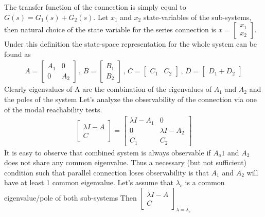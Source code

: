 \documentclass[twoside]{article}
\begin{document}
The transfer function of the connection is simply equal to $G(s) = G_1(s) + G_2(s)$. Let $x_1$ and $x_2$
state-variables of the sub-systems, then natural choice of the state variable for the series connection is 
$x = \begin{bmatrix} x_1 \\ x_2 \end{bmatrix}$. Under this definition the state-space representation for the whole system 
can be found as
%
\begin{align*}
A = \left[ \begin{array}{c|c} A_1 & 0 \\ \hline 0  & A_2 \end{array} \right]
\, , \, B = \left[ \begin{array}{c} B_1 \\ \hline B_2   \end{array} \right]
\, , \, C = \left[ \begin{array}{c|c} C_1 & C_2  \end{array} \right]
\, , \, D = \left[ \begin{array}{c} D_1 +  D_2  \end{array} \right]
\end{align*}
%
Clearly eigenvalues of A are the combination of the eigenvalues of $A_1$ and $A_2$ and the poles of the system 
Let's analyze the observability of the connection via one of the modal reachability tests. 
%
\begin{align*}
	\left[ \begin{array}{c} \lambda I - A \\ \hline C \end{array} \right]
	= 
	\left[ \begin{array}{c|c} \lambda I - A_1 & 0 \\ \hline 0 &  \lambda I - A_2 \\ \hline 
	 C_1 & C_2
	\end{array} \right]
\end{align*}
%
It is easy to observe that combined system is always observable if $A_o1$ 
and $A_2$ does not share any common eigenvalue. Thus a necessary (but not sufficient) condition 
such that parallel connection loses observability is that $A_1$ and $A_2$ will have at least 1 
common eigenvalue. Let's assume that $\lambda_c$ is a common eigenvalue/pole of both sub-systems
Then $\left[ \begin{array}{c} \lambda I - A \\ \hline C \end{array} \right]_{\lambda = \lambda_c}$ 
\end{document}
